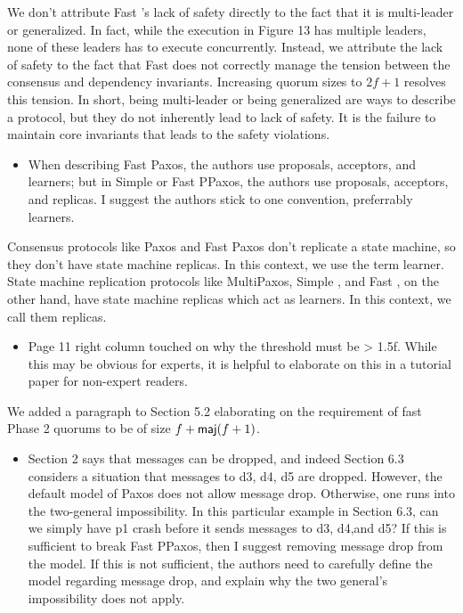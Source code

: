 \documentclass[letterpaper,twocolumn,10pt]{article}
\newenvironment{reviewerquote}
{\list{}{\leftmargin=\parindent\rightmargin=0in}\item[] \itshape \color{ReviewerDarkGray}}%
{\endlist}
\begin{document}
We don't attribute Fast \BPaxos{}'s lack of safety directly to the fact that it
is multi-leader or generalized. In fact, while the execution in Figure 13 has
multiple leaders, none of these leaders has to execute concurrently. Instead,
we attribute the lack of safety to the fact that Fast \BPaxos{} does not
correctly manage the tension between the consensus and dependency invariants.
Increasing quorum sizes to $2f+1$ resolves this tension. In short, being
multi-leader or being generalized are ways to describe a protocol, but they do
not inherently lead to lack of safety. It is the failure to maintain core
invariants that leads to the safety violations.

\begin{reviewerquote}
  \begin{itemize}
    \item
      When describing Fast Paxos, the authors use proposals, acceptors, and
      learners; but in Simple or Fast PPaxos, the authors use proposals,
      acceptors, and replicas. I suggest the authors stick to one convention,
      preferrably learners.
  \end{itemize}
\end{reviewerquote}

Consensus protocols like Paxos and Fast Paxos don't replicate a state machine,
so they don't have state machine replicas. In this context, we use the term
learner. State machine replication protocols like MultiPaxos, Simple \BPaxos{},
and Fast \BPaxos{}, on the other hand, have state machine replicas which act as
learners. In this context, we call them replicas.

\begin{reviewerquote}
  \begin{itemize}
    \item
      Page 11 right column touched on why the threshold must be > 1.5f. While
      this may be obvious for experts, it is helpful to elaborate on this in a
      tutorial paper for non-expert readers.
  \end{itemize}
\end{reviewerquote}

We added a paragraph to Section 5.2 elaborating on the requirement of fast
Phase 2 quorums to be of size $f + \textsf{maj}(f+1)$.

\begin{reviewerquote}
  \begin{itemize}
    \item
      Section 2 says that messages can be dropped, and indeed Section 6.3
      considers a situation that messages to d3, d4, d5 are dropped. However,
      the default model of Paxos does not allow message drop. Otherwise, one
      runs into the two-general impossibility. In this particular example in
      Section 6.3, can we simply have p1 crash before it sends messages to d3,
      d4,and d5? If this is sufficient to break Fast PPaxos, then I suggest
      removing message drop from the model. If this is not sufficient, the
      authors need to carefully define the model regarding message drop, and
      explain why the two general's impossibility does not apply.
  \end{itemize}
\end{reviewerquote}
\end{document}
